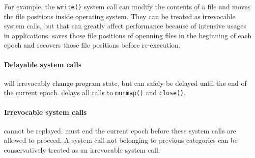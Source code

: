For example, the \texttt{write()} system call can modify the contents of a file and moves the
file positions inside operating system.
They can be treated as irrevocable system calls, but that can greatly affect performance
because of intensive usages in applications.
\doubletake{} saves those file positions of openning files in the beginning of each epoch and
recovers those file positions before re-execution.

\paragraph{Delayable system calls} will irrevocably change program state, but can safely
be delayed until the end of the current epoch.
\doubletake{} delays all calls to \texttt{munmap()} and \texttt{close()}.

\paragraph{Irrevocable system calls} cannot be replayed. \doubletake{} must end the current epoch
before these system calls are allowed to proceed. A system call not belonging to previous categories
can be conservatively treated as an irrevocable system call.

